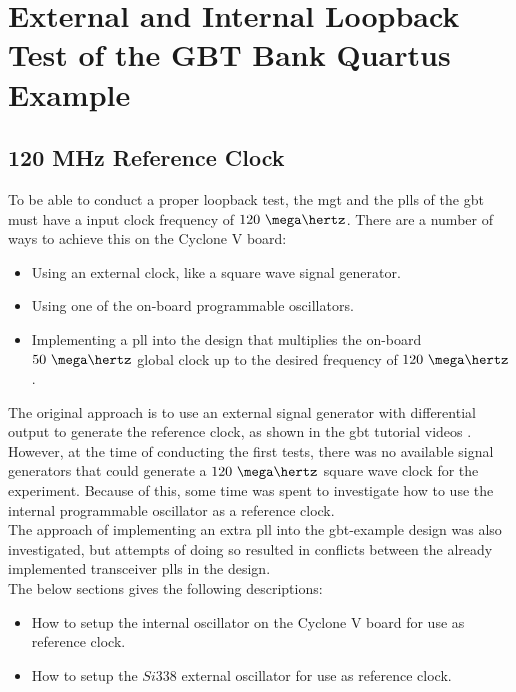 \documentclass[main.tex]{subfiles}
\begin{document}
\chapter{External and Internal Loopback Test of the GBT Bank Quartus Example}

\section{120 MHz Reference Clock}


To be able to conduct a proper loopback test, the \gls{mgt} and the \glspl{pll} of the \gls{gbt} must have a input clock frequency of $120~\mega\hertz$. There are a number of ways to achieve this on the Cyclone V board: 
\begin{itemize}\setlength{\itemsep}{10pt}
\item Using an external clock, like a square wave signal generator.
\item Using one of the on-board programmable oscillators.
\item Implementing a \gls{pll} into the design that multiplies the on-board $50~\mega\hertz$ global clock up to the desired frequency of $120~\mega\hertz$.
\end{itemize}

The original approach is to use an external signal generator with differential output to generate the reference clock, as shown in the \gls{gbt} tutorial videos \cite{gbt_videos}. However, at the time of conducting the first tests, there was no available signal generators that could generate a $120~\mega\hertz$ square wave clock for the experiment. Because of this, some time was spent to investigate how to use the internal programmable oscillator as a reference clock.\\

The approach of implementing an extra \gls{pll} into the \gls{gbt}-example design was also investigated, but attempts of doing so resulted in conflicts between the already implemented transceiver \glspl{pll} in the design. \\

The below sections gives the following descriptions:
\begin{itemize}\setlength{\itemsep}{10pt}
\item How to setup the internal oscillator on the Cyclone V board for use as reference clock.
\item How to setup the $Si338$ external oscillator for use as reference clock.
\end{itemize}
\end{document}
